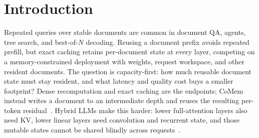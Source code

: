 \documentclass{article}
\begin{document}
\section{Introduction}
\label{sec:intro}

Repeated queries over stable documents are common in document QA, agents, tree
search, and best-of-$N$ decoding.  Reusing a document prefix avoids repeated
prefill, but exact caching retains per-document state at every layer, competing
on a memory-constrained deployment with weights, request workspace, and other
resident documents.  The question is capacity-first: how much reusable document
state must stay resident, and what latency and quality cost buys a smaller
footprint?  Dense recomputation and exact caching are the endpoints; CoMem
instead writes a document to an intermediate depth and reuses the resulting
per-token residual~\citep{liu2026comem,liu2026understanding}.  Hybrid LLMs make
this harder: lower full-attention layers also need KV, lower linear layers need
convolution and recurrent state, and those mutable states cannot be shared
blindly across requests~\citep{yang2025gateddeltanet,lieber2025jamba}.
\end{document}
